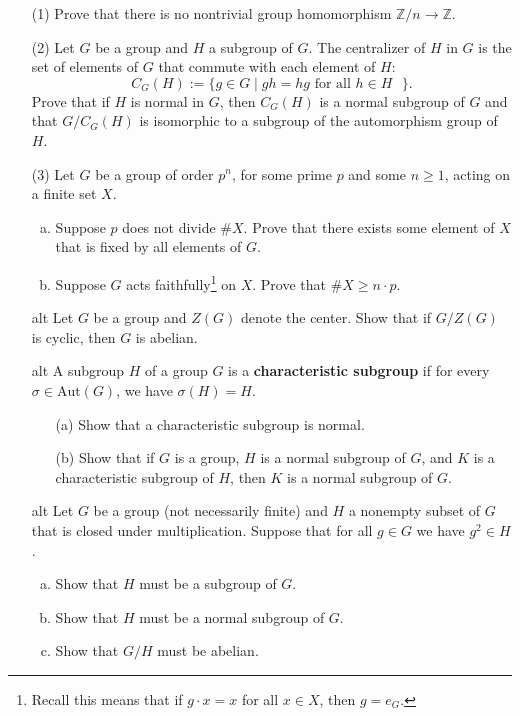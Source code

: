 \documentclass[11pt]{article}
\newcommand{\Z}{\mathbb{Z}}
\theoremstyle{definition}
\begin{document}
\begin{enumerate}
 
 \item[(1)] Prove that there is no nontrivial group homomorphism $\Z/n \to \Z$.
 
 \item[(2)] Let $G$ be a group and $H$ a subgroup of $G$. The centralizer of $H$ in $G$ is the set of elements of $G$ that commute with each element of $H$:
  $$
  C_G(H) := \{g \in G \mid gh = hg \text{ for all $h \in H$ }\}.
  $$
  Prove that if $H$ is normal in $G$, then $C_G(H)$ is a normal subgroup of $G$ and that $G/C_G(H)$ is isomorphic to a subgroup of the automorphism group of $H$.
 
 
 \item[(3)] Let $G$ be a group of order $p^n$, for some prime $p$ and some $n\geq 1$, acting on a finite set $X$.
  \begin{enumerate}[(a)]
    \item Suppose $p$ does not divide $\# X$. Prove that there exists some element of $X$ that is fixed by all elements of $G$.
      \item Suppose $G$ acts faithfully\footnote{Recall this means that if $g \cdot x = x$ for all $x \in X$, then $g = e_G$.} on $X$.  Prove that $\# X \geq n \cdot p$.
      \end{enumerate}
      
    \item[alt] Let $G$ be a group and $Z(G)$ denote the center. Show that if $G/Z(G)$ is cyclic, then $G$ is abelian.
    
    \item[alt] A subgroup $H$ of a group $G$ is a \textbf{characteristic subgroup} if for every $\sigma\in \mathrm{Aut}(G)$, we have $\sigma(H) = H$.
\begin{enumerate}
\item[(a)] Show that a characteristic subgroup is normal.
\item[(b)] Show that if $G$ is a group, $H$ is a normal subgroup of $G$, and $K$ is a characteristic subgroup of $H$, then $K$ is a normal subgroup of $G$.
\end{enumerate}

\item[alt] Let $G$ be a group (not necessarily finite) and $H$ a nonempty subset of $G$ that is closed under multiplication. Suppose that for all $g \in G$ we have $g^2 \in H$.
\begin{enumerate}[(a)]
	\item Show that $H$ must be a subgroup of $G$.
	\item Show that $H$ must be a normal subgroup of $G$.
	\item Show that $G/H$ must be abelian.
\end{enumerate}

 \end{enumerate}
\end{document}
